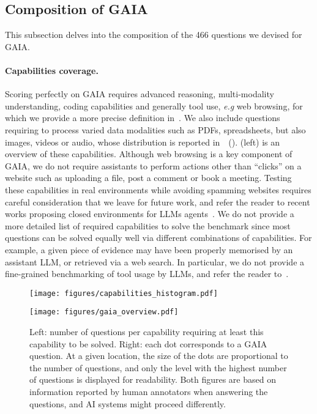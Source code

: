 \documentclass{fairmeta}
\newcommand{\benchmark}{\textsc{GAIA}}
\newcommand{\total}{466}
\begin{document}
\subsection{Composition of \benchmark{}}
\label{sec:composition}

This subsection delves into the composition of the \total{} questions we devised for \benchmark{}. 

\vspace{-0.2cm}

\paragraph{Capabilities coverage.} Scoring perfectly on \benchmark{} requires advanced reasoning, multi-modality understanding, coding capabilities and generally tool use, \textit{e.g} web browsing, for which we provide a more precise definition in~. We also include questions requiring to process varied data modalities such as PDFs, spreadsheets, but also images, videos or audio, whose distribution is reported in~~().  (left) is an overview of these capabilities. Although web browsing is a key component of \benchmark{}, we do not require assistants to perform actions other than ``clicks'' on a website such as uploading a file, post a comment or book a meeting. Testing these capabilities in real environments while avoiding spamming websites requires careful consideration that we leave for future work, and refer the reader to recent works proposing closed environments for LLMs agents~\citep{liu2023agentbench}. We do not provide a more detailed list of required capabilities to solve the benchmark since most questions can be solved equally well via different combinations of capabilities. For example, a given piece of evidence may have been properly memorised by an assistant LLM, or retrieved via a web search.
In particular, we do not provide a fine-grained benchmarking of tool usage by LLMs, and refer the reader to~\citet{xu2023tool,li2023apibank}.

\begin{figure}
    \centering
    \begin{minipage}[c]{0.475\textwidth}
        \texttt{[image: figures/capabilities\_histogram.pdf]}
    \end{minipage}
    \begin{minipage}[c]{0.48\textwidth}
        \texttt{[image: figures/gaia\_overview.pdf]}
    \end{minipage}
    \caption{Left: number of questions per capability requiring at least this capability to be solved. Right: each dot corresponds to a \benchmark{} question. At a given location, the size of the dots are proportional to the number of questions,
    and only the level with the highest number of questions is displayed for readability. Both figures are based on information reported by human annotators when answering the questions, and AI systems might proceed differently.}
    \label{fig:gaia_overview}
\end{figure}
\end{document}
